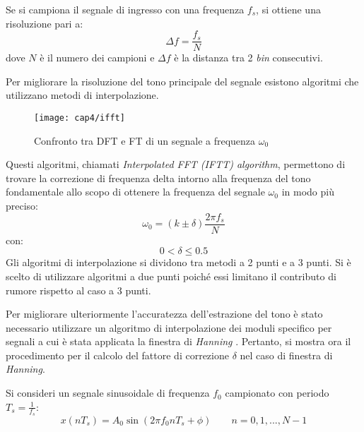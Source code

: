 Se si campiona il segnale di ingresso con una frequenza $f_s$, si ottiene una risoluzione pari a:
\begin{equation}
	\Delta f = \frac{f_s}{N}
	\label{deltaf}
\end{equation}
dove $N$ è il numero dei campioni e $\Delta f$ è la distanza tra 2 \textit{bin} consecutivi.

Per migliorare la risoluzione del tono principale del segnale esistono algoritmi che utilizzano metodi di interpolazione.
\begin{figure}[H] 
  \begin{center}
    \texttt{[image: cap4/ifft]}
    \caption{Confronto tra DFT e FT di un segnale a frequenza $\omega _0$}
    \label{ifft}
  \end{center}
\end{figure}

Questi algoritmi, chiamati \textit{Interpolated FFT (IFTT) algorithm}, permettono di trovare la correzione di frequenza delta intorno alla frequenza del tono fondamentale allo scopo di ottenere la frequenza del segnale $\omega _0$  in modo più preciso:	
\begin{equation}
	\omega _0 = (k \pm \delta)\frac{2 \pi f_s}{N}
\end{equation}
con:
$$ 0 < \delta \leq 0.5$$
Gli algoritmi di interpolazione si dividono tra metodi a 2 punti e a 3 punti. Si è scelto di utilizzare algoritmi a due punti poiché essi limitano il contributo di rumore rispetto al caso a 3 punti. 

Per migliorare ulteriormente l'accuratezza dell'estrazione del tono è stato necessario utilizzare un algoritmo di interpolazione dei moduli specifico per segnali a cui è stata applicata la finestra di \textit{Hanning} \cite{1007077}. Pertanto, si mostra ora il procedimento per il calcolo del fattore di correzione $\delta$ nel caso di finestra di \textit{Hanning}.

Si consideri un segnale sinusoidale di frequenza $f_0$ campionato con periodo $T_s=\frac{1}{f_s}$:
\begin{equation}
	x(nT_s)=A_0 \sin ( 2 \pi f_0 n T_s + \phi ) \qquad n=0,1,...,N-1
	\label{xcampionato}
\end{equation}

